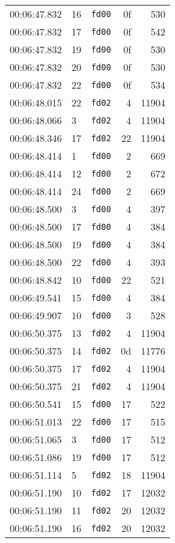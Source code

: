 \documentclass{article}
\begin{document}
\begin{longtable}{lllrr}
00:06:47.832 & 16 & \texttt{fd00} & 0f & 530 \\
00:06:47.832 & 17 & \texttt{fd00} & 0f & 542 \\
00:06:47.832 & 19 & \texttt{fd00} & 0f & 530 \\
00:06:47.832 & 20 & \texttt{fd00} & 0f & 530 \\
00:06:47.832 & 22 & \texttt{fd00} & 0f & 534 \\
00:06:48.015 & 22 & \texttt{fd02} & 4 & 11904 \\
00:06:48.066 & 3 & \texttt{fd02} & 4 & 11904 \\
00:06:48.346 & 17 & \texttt{fd02} & 22 & 11904 \\
00:06:48.414 & 1 & \texttt{fd00} & 2 & 669 \\
00:06:48.414 & 12 & \texttt{fd00} & 2 & 672 \\
00:06:48.414 & 24 & \texttt{fd00} & 2 & 669 \\
00:06:48.500 & 3 & \texttt{fd00} & 4 & 397 \\
00:06:48.500 & 17 & \texttt{fd00} & 4 & 384 \\
00:06:48.500 & 19 & \texttt{fd00} & 4 & 384 \\
00:06:48.500 & 22 & \texttt{fd00} & 4 & 393 \\
00:06:48.842 & 10 & \texttt{fd00} & 22 & 521 \\
00:06:49.541 & 15 & \texttt{fd00} & 4 & 384 \\
00:06:49.907 & 10 & \texttt{fd00} & 3 & 528 \\
00:06:50.375 & 13 & \texttt{fd02} & 4 & 11904 \\
00:06:50.375 & 14 & \texttt{fd02} & 0d & 11776 \\
00:06:50.375 & 17 & \texttt{fd02} & 4 & 11904 \\
00:06:50.375 & 21 & \texttt{fd02} & 4 & 11904 \\
00:06:50.541 & 15 & \texttt{fd00} & 17 & 522 \\
00:06:51.013 & 22 & \texttt{fd00} & 17 & 515 \\
00:06:51.065 & 3 & \texttt{fd00} & 17 & 512 \\
00:06:51.086 & 19 & \texttt{fd00} & 17 & 512 \\
00:06:51.114 & 5 & \texttt{fd02} & 18 & 11904 \\
00:06:51.190 & 10 & \texttt{fd02} & 17 & 12032 \\
00:06:51.190 & 11 & \texttt{fd02} & 20 & 12032 \\
00:06:51.190 & 16 & \texttt{fd02} & 20 & 12032 \\

\end{longtable}
\end{document}
